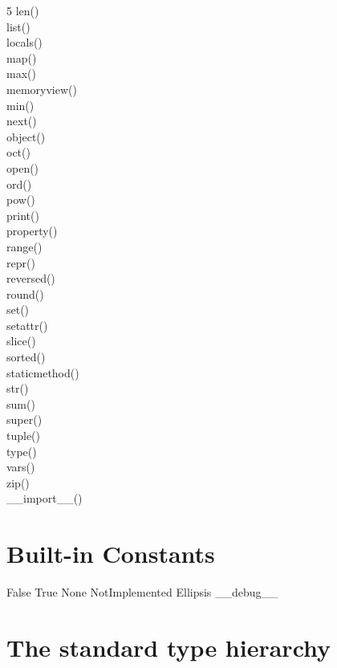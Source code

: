 \documentclass [8pt] {extarticle}
\begin{document}
\begin {multicols} {5}
        len() \\
        list() \\
        locals() \\
        map() \\
        max() \\
        memoryview() \\
        min() \\
        next() \\
        object() \\
        oct() \\
        open() \\
        ord() \\
        pow() \\
        print() \\
        property() \\
        range() \\
        repr() \\
        reversed() \\
        round() \\
        set() \\
        setattr() \\
        slice() \\
        sorted() \\
        staticmethod() \\
        str() \\
        sum() \\
        super() \\
        tuple() \\
        type() \\
        vars() \\
        zip() \\
        \_\_import\_\_() \\
    \end {multicols}

    \section {Built-in Constants}

    False \quad
    True \quad
    None \quad
    NotImplemented \quad
    Ellipsis \quad
    \_\_debug\_\_

    \section {The standard type hierarchy}
\end{document}
